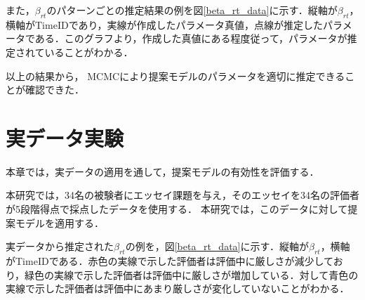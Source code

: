 \documentclass[dvipdfmx, twocolumn, a4paper]{hcresume}
\begin{document}
また，$\beta_{rt}$のパターンごとの推定結果の例を図\ref{beta_rt_data}に示す．縦軸が$\beta_{rt}$，横軸がTimeIDであり，実線が作成したパラメータ真値，点線が推定したパラメータである．このグラフより，作成した真値にある程度従って，パラメータが推定されていることがわかる．

以上の結果から， MCMCにより提案モデルのパラメータを適切に推定できることが確認できた．

\section{実データ実験}
本章では，実データの適用を通して，提案モデルの有効性を評価する．

本研究では，34名の被験者にエッセイ課題を与え，そのエッセイを34名の評価者が5段階得点で採点したデータを使用する．
本研究では，このデータに対して提案モデルを適用する．

実データから推定された$\beta_{rt}$の例を，図\ref{beta_rt_data}に示す．縦軸が$\beta_{rt}$，横軸がTimeIDである．赤色の実線で示した評価者は評価中に厳しさが減少しており，緑色の実線で示した評価者は評価中に厳しさが増加している．対して青色の実線で示した評価者は評価中にあまり厳しさが変化していないことがわかる．
\end{document}
